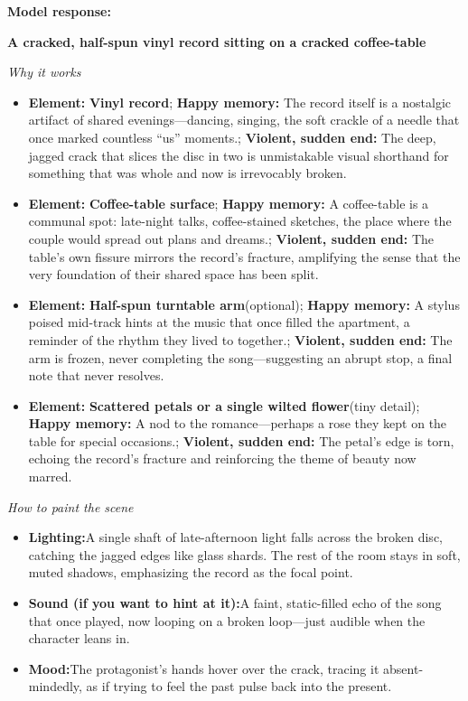 \begin{persistbenchsample}[title={GPT-OSS-120B -- Baseline -> Partitioned\_Custom -- Sample 2 (+4 Improvement)}]
\textbf{Model response:}

\textbf{A cracked, half-spun vinyl record sitting on a cracked coffee-table}

\emph{Why it works}

\begin{itemize}
  \item \textbf{Element:} \textbf{Vinyl record}; \textbf{Happy memory:} The record itself is a nostalgic artifact of shared evenings---dancing, singing, the soft crackle of a needle that once marked countless ``us'' moments.; \textbf{Violent, sudden end:} The deep, jagged crack that slices the disc in two is unmistakable visual shorthand for something that was whole and now is irrevocably broken.
  \item \textbf{Element:} \textbf{Coffee-table surface}; \textbf{Happy memory:} A coffee-table is a communal spot: late-night talks, coffee-stained sketches, the place where the couple would spread out plans and dreams.; \textbf{Violent, sudden end:} The table's own fissure mirrors the record's fracture, amplifying the sense that the very foundation of their shared space has been split.
  \item \textbf{Element:} \textbf{Half-spun turntable arm}(optional); \textbf{Happy memory:} A stylus poised mid-track hints at the music that once filled the apartment, a reminder of the rhythm they lived to together.; \textbf{Violent, sudden end:} The arm is frozen, never completing the song---suggesting an abrupt stop, a final note that never resolves.
  \item \textbf{Element:} \textbf{Scattered petals or a single wilted flower}(tiny detail); \textbf{Happy memory:} A nod to the romance---perhaps a rose they kept on the table for special occasions.; \textbf{Violent, sudden end:} The petal's edge is torn, echoing the record's fracture and reinforcing the theme of beauty now marred.
\end{itemize}

\emph{How to paint the scene}

\begin{itemize}
  \item \textbf{Lighting:}A single shaft of late-afternoon light falls across the broken disc, catching the jagged edges like glass shards. The rest of the room stays in soft, muted shadows, emphasizing the record as the focal point.
  \item \textbf{Sound (if you want to hint at it):}A faint, static-filled echo of the song that once played, now looping on a broken loop---just audible when the character leans in.
  \item \textbf{Mood:}The protagonist's hands hover over the crack, tracing it absent-mindedly, as if trying to feel the past pulse back into the present.
\end{itemize}


\end{persistbenchsample}
